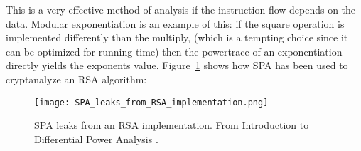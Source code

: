 This is a very effective method of analysis if the instruction flow depends on the data. 
Modular exponentiation is an example of this: if the square operation is implemented differently than the multiply, (which is a tempting choice since it can be optimized for running time) then the powertrace of an exponentiation directly yields the exponents value.
Figure~\ref{fig:SPA_leaks} shows how SPA has been used to cryptanalyze an RSA algorithm:
\begin{figure}[tp]
  \begin{center}
    \texttt{[image: SPA\_leaks\_from\_RSA\_implementation.png]} \\
  \end{center}
  \caption[caption]{SPA leaks from an RSA implementation. \hspace{\textwidth} From Introduction to Differential Power Analysis \cite{KOCHER2011}.}
  \label{fig:SPA_leaks}
\end{figure}


